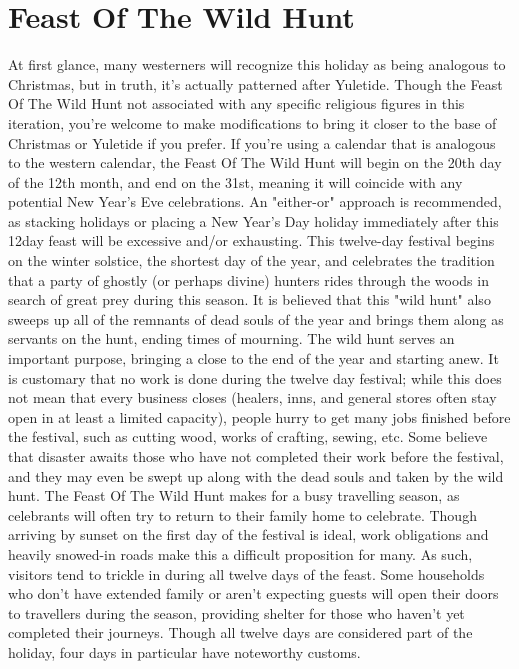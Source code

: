 \documentclass[10pt,a4paper,twoside,twocolumn,openany,bg=print,nodeprecatedcode]{dndbook}
\begin{document}
\section{Feast Of The Wild Hunt}
At first glance, many westerners will recognize this holiday as being analogous to Christmas, but in truth, it's actually patterned after Yuletide. Though the Feast Of The Wild Hunt not associated with any specific religious figures in this iteration, you're welcome to make modifications to bring it closer to the base of Christmas or Yuletide if you prefer. If you're using a calendar that is analogous to the western calendar, the Feast Of The Wild Hunt will begin on the 20th day of the 12th month, and end on the 31st, meaning it will coincide with any potential New Year's Eve celebrations. An "either-or" approach is recommended, as stacking holidays or placing a New Year's Day holiday immediately after this 12day feast will be excessive and/or exhausting.
This twelve-day festival begins on the winter solstice, the shortest day of the year, and celebrates the tradition that a party of ghostly (or perhaps divine) hunters rides through the woods in search of great prey during this season. It is believed that this "wild hunt" also sweeps up all of the remnants of dead souls of the year and brings them along as servants on the hunt, ending times of mourning. The wild hunt serves an important purpose, bringing a close to the end of the year and starting anew.
It is customary that no work is done during the twelve day festival; while this does not mean that every business closes (healers, inns, and general stores often stay open in at least a limited capacity), people hurry to get many jobs finished before the festival, such as cutting wood, works of crafting, sewing, etc. Some believe that disaster awaits those who have not completed their work before the festival, and they may even be swept up along with the dead souls and taken by the wild hunt. The Feast Of The Wild Hunt makes for a busy travelling season, as celebrants will often try to return to their family home to celebrate. Though arriving by sunset on the first day of the festival is ideal, work obligations and heavily snowed-in roads make this a difficult proposition for many. As such, visitors tend to trickle in during all twelve days of the feast. Some households who don't have extended family or aren't expecting guests will open their doors to travellers during the season, providing shelter for those who haven't yet completed their journeys. Though all twelve days are considered part of the holiday, four days in particular have noteworthy customs.
\end{document}
